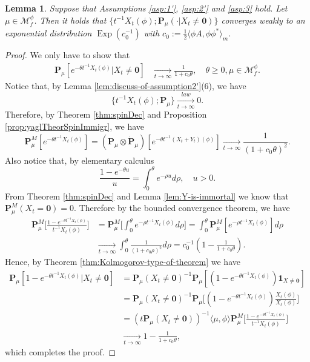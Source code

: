 \documentclass[UTF8]{pkuthss}
\theoremstyle{plain}
\newtheorem{lem}[thm]{Lemma}
\theoremstyle{definition}
\numberwithin{equation}{section}
\begin{document}
\begin{lem}\label{lem:Yaglom-for-phi}
	Suppose that Assumptions \ref{asp:1'}, \ref{asp:2'} and \ref{asp:3} hold. Let $\mu \in \mathcal M_f^\phi$.
	Then it holds that $\{t^{-1}X_t(\phi);\mathbf P_\mu(\cdot | X_t\neq\mathbf 0)\}$
   converges weakly to 
   an exponential distribution
	$\operatorname{Exp}(c_0^{-1})$ with $c_0 := \frac{1}{2}\langle\phi A,\phi\phi^*\rangle_m$.
\end{lem}

\begin{proof}
 We only have to show that
\[\begin{split}
	\mathbf P_\mu[e^{-\theta t^{-1}X_t(\phi)} |X_t\neq\mathbf 0]
	&\xrightarrow[t\to\infty]{}\frac{1}{1+c_0\theta},
	\quad \theta\geq 0, \mu\in \mathcal M_f^\phi.
\end{split}\]
	Notice that, by Lemma \ref{lem:discuss-of-assumption2'}(6), we have
\[
	\{t^{-1}X_t(\phi);\mathbf P_\mu\}
	\xrightarrow[t\to\infty]{law} 0.
\]
	Therefore, by Theorem \ref{thm:spinDec} and Proposition \ref{prop:yaglTheorSpinImmigr}, we have
\[
	\mathbf P^M_\mu[e^{-\theta t^{-1}X_t(\phi)}]
	= (\mathbf P_\mu \otimes \dot {\mathbf P}_\mu)[e^{-\theta t^{-1}(X_t+Y_t)(\phi)}]
	\xrightarrow[t\to\infty]{}\frac{1}{(1+c_0\theta)^2}.
\]
	Also notice that, by elementary calculus
\[
	\frac{1-e^{-\theta u}}{u}
	=\int_0^\theta e^{-\rho u} d\rho,
	\quad u> 0.
\]
	From Theorem \ref{thm:spinDec} and Lemma \ref{lem:Y-is-immortal} we know that $\mathbf P^M_\mu(X_t=\mathbf 0)=0$.
	Therefore by the bounded convergence theorem, we have
\[\begin{split}
	\mathbf P^M_\mu \Big[\frac{1-e^{-\theta t^{-1}X_t(\phi)}}{t^{-1}X_t(\phi)}\Big]
	&= \mathbf P^M_\mu\Big[\int_0^\theta e^{-\rho t^{-1}X_t(\phi) }d\rho\Big]
	= \int_0^\theta \mathbf P^M_\mu [ e^{-\rho t^{-1}X_t(\phi) }] d\rho\\
	&\xrightarrow[t\to\infty]{} \int_0^\theta \frac{1}{(1+c_0\rho)^2}d\rho
	= c_0^{-1} (1-\frac{1}{1+c_0\theta}).
\end{split}\]
	Hence, by Theorem \ref{thm:Kolmogorov-type-of-theorem} we have
\[\begin{split}
	\mathbf P_\mu[1-e^{-\theta t^{-1}X_t(\phi)} |X_t\neq \mathbf 0]
	&= \mathbf P_\mu(X_t\neq \mathbf 0)^{-1}\mathbf P_\mu[(1-e^{-\theta t^{-1}X_t(\phi)})\mathbf 1_{X\neq \mathbf 0}]\\
	&= \mathbf P_\mu(X_t\neq \mathbf 0)^{-1}\mathbf P_\mu\Big[(1-e^{-\theta t^{-1}X_t(\phi)})\frac{X_t(\phi)}{X_t(\phi)}\Big]\\
	&= (t\mathbf P_\mu(X_t\neq \mathbf 0))^{-1} \langle\mu,\phi\rangle \mathbf P^M_\mu \Big[\frac{1-e^{-\theta t^{-1}X_t(\phi)}}{t^{-1}X_t(\phi)}\Big]\\
	&\xrightarrow[t\to\infty]{}1-\frac{1}{1+c_0\theta},
\end{split}\]
	which completes the proof.
\end{proof}
\end{document}
